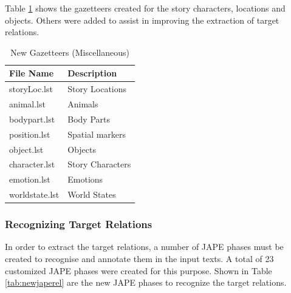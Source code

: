 Table \ref{tab:newgazetteersstory} shows the gazetteers created for the story characters, locations and objects. Others were added to assist in improving the extraction of target relations.

\begin{table}[H]   %
\centering
\caption{New Gazetteers (Miscellaneous)} \vspace{0.25em}
\begin{tabular}{|p{5cm}|p{5cm}|} \hline
\textbf{File Name} & \textbf{Description} \\ \hline
storyLoc.lst		& Story Locations \\ \hline
animal.lst			& Animals \\ \hline
bodypart.lst		& Body Parts \\ \hline
position.lst		& Spatial markers \\ \hline
object.lst			& Objects \\ \hline
character.lst		& Story Characters \\ \hline
emotion.lst			& Emotions \\ \hline
worldstate.lst 		& World States \\ \hline
\end{tabular}
\label{tab:newgazetteersstory}
\end{table}

\subsubsection{Recognizing Target Relations}
\label{sec:recogtarget}

In order to extract the target relations, a number of JAPE phases must be created to recognise and annotate them in the input texts. A total of 23 customized JAPE phases were created for this purpose. Shown in Table \ref{tab:newjaperel} are the new JAPE phases to recognize the target relations. 


